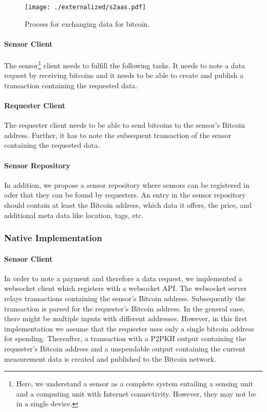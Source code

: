 \begin{figure}
\begin{center}
\texttt{[image: ./externalized/s2aas.pdf]}
\caption{Process for exchanging data for bitcoin.}
\label{fig:process}
\end{center}
\end{figure}

\paragraph{Sensor Client}
The sensor\footnote{Here, we understand a sensor as a complete system entailing a sensing unit and a computing unit with Internet connectivity. However, they may not be in a single device.} client needs to fulfill the following tasks. It needs to note a data
request by receiving bitcoins and it needs to be able to create and publish a
transaction containing the requested data.

\paragraph{Requester Client}
The requester client needs to be able to send bitcoins to the sensor's Bitcoin
address. Further, it has to note the subsequent transaction of the sensor
containing the requested data.

\paragraph{Sensor Repository}
In addition, we propose a sensor repository where sensors can be registered in
oder that they can be found by requesters. An entry in the sensor repository should
contain at least the Bitcoin address, which data it offers, the price, and
additional meta data like location, tags, etc.

\subsubsection{Native Implementation}

\paragraph{Sensor Client}
In order to note a payment and therefore a data request, we implemented a websocket
client which registers with a websocket API. The websocket server relays transactions containing
the sensor's Bitcoin address. Subsequently the transaction is parsed for the 
requester's Bitcoin address. In the general case, there might be multiple inputs
with different addresses. However, in this first implementation we assume that the
requester uses only a single bitcoin address for spending. Thereafter, a transaction
with a P2PKH output containing the requester's Bitcoin address and a
unspendable output containing the current measurement data is created and published
to the Bitcoin network. 

